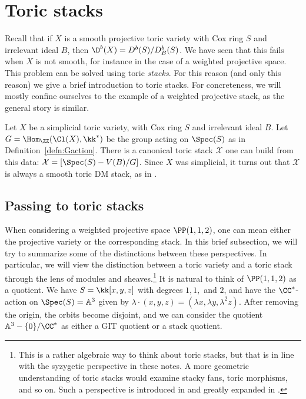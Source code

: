 \section{Toric stacks}
Recall that if $X$ is a smooth projective toric variety with Cox ring $S$ and irrelevant ideal $B$, then $\D^b(X) = D^b(S) / D^b_B(S)$. We have seen that this fails when $X$ is not smooth, for instance in the case of a weighted projective space. This problem can be solved using toric \emph{stacks}. For this reason (and only this reason) we give a brief introduction to toric stacks. For concreteness, we will mostly confine ourselves to the example of a weighted projective stack, as the general story is similar.


Let $X$ be a simplicial toric variety, with Cox ring $S$ and irrelevant ideal $B$.  Let $G=\Hom_{\ZZ}(\Cl(X), \kk^*)$ be the group acting on $\Spec(S)$ as in Definition~\ref{defn:Gaction}.  There is a canonical toric stack $\mathcal X$ one can build from this data: $\mathcal X = [\Spec(S) - V(B) / G]$.  Since $X$ was simplicial, it turns out that $\mathcal X$ is always a smooth toric DM stack, as in \cite{BCS05}.



\subsection{Passing to toric stacks}
When considering a weighted projective space $\PP(1,1,2)$, one can mean either the projective variety or the corresponding stack.  In this brief subsection, we will try to summarize some of the distinctions between these perspectives.  In particular, we will view the distinction between a toric variety and a toric stack through the lens of modules and sheaves.\footnote{This is a rather algebraic way to think about toric stacks, but that is in line with the syzygetic perspective in these notes.  A more geometric understanding of toric stacks would examine stacky fans, toric morphisms, and so on.  Such a perspective is introduced in \cite{BCS05} and greatly expanded in \cite{GS15a, GS15b}.}
It is natural to think of $\PP(1,1,2)$ as a quotient.  We have $S = \kk[x,y,z]$ with degrees $1,1,$ and $2$, and have the $\CC^*$-action on $\Spec(S) = \mathbb A^3$ given by $\lambda \cdot (x,y,z) = (\lambda x, \lambda y, \lambda^2 z)$.  After removing the origin, the orbits become disjoint, and we can consider the quotient $\mathbb A^3 - \{0\} / \CC^*$ as either a GIT quotient or a stack quotient.

